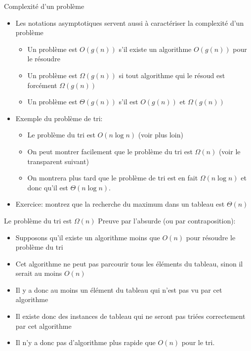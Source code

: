 \begin{frame}{Complexité d'un problème}
\begin{itemize}
\item Les notations asymptotiques servent aussi à caractériser la complexité
  d'un problème
\begin{itemize}
\item Un problème est $O(g(n))$  s'il existe un algorithme $O(g(n))$ pour le résoudre
\item Un problème est $\Omega(g(n))$ si tout algorithme qui le résoud est forcément $\Omega(g(n))$
\item Un problème est $\Theta(g(n))$ s'il est $O(g(n))$ et $\Omega(g(n))$
\end{itemize}
\item Exemple du problème de tri:
\begin{itemize}
\item Le problème du tri est $O(n \log n)$ (voir plus loin)
\item On peut montrer facilement que le problème du tri est $\Omega(n)$ (voir le transparent suivant)
\item On montrera plus tard que le problème de tri est en fait $\Omega(n \log n)$ et donc qu'il est $\Theta(n\log n)$.
\end{itemize}
\item Exercice: montrez que la recherche du maximum dans un tableau est $\Theta(n)$
\end{itemize}
\end{frame}


\begin{frame}{Le problème du tri est $\Omega(n)$}
Preuve par l'absurde (ou par contraposition):
\begin{itemize}
\item Supposons qu'il existe un algorithme moins que $O(n)$ pour résoudre le problème du tri
\item Cet algorithme ne peut pas parcourir tous les éléments du tableau, sinon il serait au moins $O(n)$
\item Il y a donc au moins un élément du tableau qui n'est pas vu par cet algorithme
\item Il existe donc des instances de tableau qui ne seront pas triées correctement par cet algorithme
\item Il n'y a donc pas d'algorithme plus rapide que $O(n)$ pour le tri.
\end{itemize}
\end{frame}

